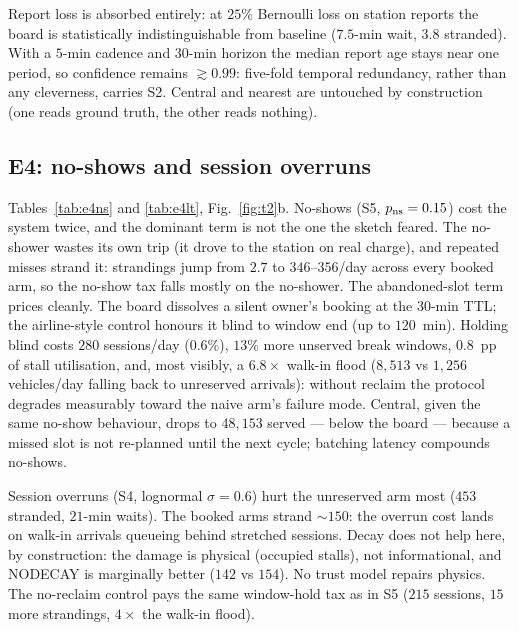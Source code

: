 \documentclass[twoside,twocolumn,usenatbib]{mnras}
\begin{document}
Report loss is absorbed entirely: at $25\%$ Bernoulli loss on
station reports the board is statistically indistinguishable from
baseline ($7.5$-min wait, $3.8$ stranded).  With a $5$-min cadence
and $30$-min horizon the median report age stays near one period, so
confidence remains $\gtrsim0.99$: five-fold temporal redundancy,
rather than any cleverness, carries S2.  Central and nearest are
untouched by construction (one reads ground truth, the other reads
nothing).





\subsection{E4: no-shows and session overruns}

Tables~\ref{tab:e4ns} and \ref{tab:e4lt}, Fig.~\ref{fig:t2}b.
No-shows (S5, $p_{\rm ns}=0.15$) cost the system twice, and the
dominant term is not the one the sketch feared.  The no-shower wastes
its own trip (it drove to the station on real charge), and
repeated misses strand it: strandings jump from $2.7$ to
$346$--$356$/day across every booked arm, so the no-show tax falls
mostly on the no-shower.  The abandoned-slot term prices cleanly.
The board dissolves a silent owner's booking at the $30$-min TTL;
the airline-style control honours it blind to window end (up to
$120$~min).  Holding blind costs $280$ sessions/day ($0.6\%$),
$13\%$ more unserved break windows, $0.8$~pp of stall utilisation,
and, most visibly, a $6.8\times$ walk-in flood ($8{,}513$ vs
$1{,}256$ vehicles/day falling back to unreserved arrivals):
without reclaim the protocol degrades measurably toward the naive
arm's failure mode.  Central, given the same no-show behaviour,
drops to $48{,}153$ served --- below the board --- because a missed
slot is not re-planned until the next cycle; batching latency
compounds no-shows.

Session overruns (S4, lognormal $\sigma=0.6$) hurt the unreserved
arm most ($453$ stranded, $21$-min waits).  The booked arms strand
$\sim\!150$: the overrun cost lands on walk-in arrivals queueing
behind stretched sessions.  Decay does not help here, by
construction: the damage is physical (occupied stalls), not
informational, and NODECAY is marginally better ($142$ vs $154$).
No trust model repairs physics.  The no-reclaim control pays the
same window-hold tax as in S5 ($215$ sessions, $15$ more
strandings, $4\times$ the walk-in flood).
\end{document}

